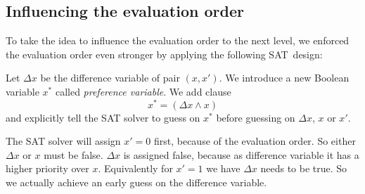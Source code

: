 \subsection{Influencing the evaluation order}
\label{sec:enc-diff-desc-eo}
%
To take the idea to influence the evaluation order to the next level,
we enforced the evaluation order even stronger by applying the following SAT~design:

Let $\Delta x$ be the difference variable of pair $(x, x')$. We introduce a new Boolean
variable $x^*$ called \emph{preference variable}. We add clause
\[ x^* = (\Delta x \land x) \]
and explicitly tell the SAT solver to guess on $x^*$ before guessing on $\Delta x$, $x$ or $x'$.

The SAT solver will assign $x'=0$ first, because of the evaluation order. So either $\Delta x$
or $x$ must be false. $\Delta x$ is assigned false, because as difference variable it has a higher
priority over $x$. Equivalently for $x'=1$ we have $\Delta x$ needs to be true. So we actually
achieve an early guess on the difference variable.
